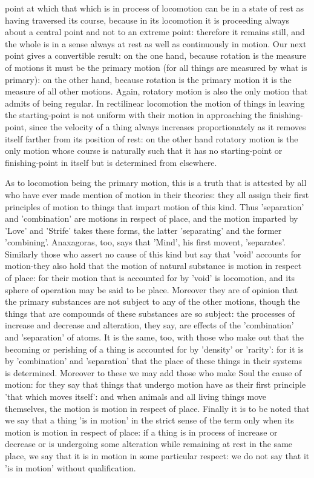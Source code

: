 point at which that which is in process of locomotion can be in a
state of rest as having traversed its course, because in its locomotion
it is proceeding always about a central point and not to an extreme
point: therefore it remains still, and the whole is in a sense always
at rest as well as continuously in motion. Our next point gives a
convertible result: on the one hand, because rotation is the measure
of motions it must be the primary motion (for all things are measured
by what is primary): on the other hand, because rotation is the primary
motion it is the measure of all other motions. Again, rotatory motion
is also the only motion that admits of being regular. In rectilinear
locomotion the motion of things in leaving the starting-point is not
uniform with their motion in approaching the finishing-point, since
the velocity of a thing always increases proportionately as it removes
itself farther from its position of rest: on the other hand rotatory
motion is the only motion whose course is naturally such that it has
no starting-point or finishing-point in itself but is determined from
elsewhere. 

As to locomotion being the primary motion, this is a truth that is
attested by all who have ever made mention of motion in their theories:
they all assign their first principles of motion to things that impart
motion of this kind. Thus 'separation' and 'combination' are motions
in respect of place, and the motion imparted by 'Love' and 'Strife'
takes these forms, the latter 'separating' and the former 'combining'.
Anaxagoras, too, says that 'Mind', his first movent, 'separates'.
Similarly those who assert no cause of this kind but say that 'void'
accounts for motion-they also hold that the motion of natural substance
is motion in respect of place: for their motion that is accounted
for by 'void' is locomotion, and its sphere of operation may be said
to be place. Moreover they are of opinion that the primary substances
are not subject to any of the other motions, though the things that
are compounds of these substances are so subject: the processes of
increase and decrease and alteration, they say, are effects of the
'combination' and 'separation' of atoms. It is the same, too, with
those who make out that the becoming or perishing of a thing is accounted
for by 'density' or 'rarity': for it is by 'combination' and 'separation'
that the place of these things in their systems is determined. Moreover
to these we may add those who make Soul the cause of motion: for they
say that things that undergo motion have as their first principle
'that which moves itself': and when animals and all living things
move themselves, the motion is motion in respect of place. Finally
it is to be noted that we say that a thing 'is in motion' in the strict
sense of the term only when its motion is motion in respect of place:
if a thing is in process of increase or decrease or is undergoing
some alteration while remaining at rest in the same place, we say
that it is in motion in some particular respect: we do not say that
it 'is in motion' without qualification. 

